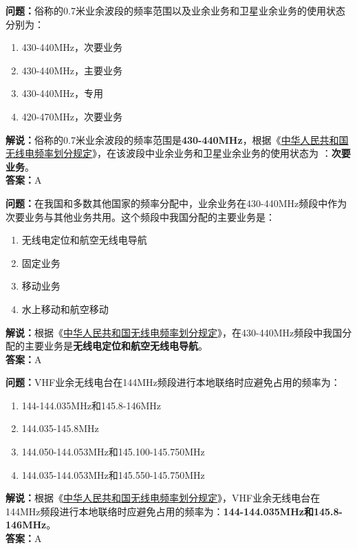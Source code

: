 \textbf{问题：}俗称的0.7米业余波段的频率范围以及业余业务和卫星业余业务的使用状态分别为：
\begin{enumerate}[label=\Alph*), leftmargin=1.5cm]
  \item 430-440MHz，次要业务
  \item 430-440MHz，主要业务
  \item 430-440MHz，专用
  \item 420-470MHz，次要业务
\end{enumerate}
\textbf{解说：}俗称的0.7米业余波段的频率范围是\textbf{430-440MHz}，根据《\href{https://www.miit.gov.cn/zwgk/zcwj/wjfb/txy/art/2020/art_066386284cd2449493586c81ccafed11.html}{中华人民共和国无线电频率划分规定}》，在该波段中业余业务和卫星业余业务的使用状态为 ：\textbf{次要业务}。\\\textbf{答案：}A

\textbf{问题：}在我国和多数其他国家的频率分配中，业余业务在430-440MHz频段中作为次要业务与其他业务共用。这个频段中我国分配的主要业务是：
\begin{enumerate}[label=\Alph*), leftmargin=1.5cm]
  \item 无线电定位和航空无线电导航
  \item 固定业务
  \item 移动业务
  \item 水上移动和航空移动
\end{enumerate}
\textbf{解说：}根据《\href{https://www.miit.gov.cn/zwgk/zcwj/wjfb/txy/art/2020/art_066386284cd2449493586c81ccafed11.html}{中华人民共和国无线电频率划分规定}》，在430-440MHz频段中我国分配的主要业务是\textbf{无线电定位和航空无线电导航}。\\\textbf{答案：}A

\textbf{问题：}VHF业余无线电台在144MHz频段进行本地联络时应避免占用的频率为：
\begin{enumerate}[label=\Alph*), leftmargin=1.5cm]
  \item 144-144.035MHz和145.8-146MHz
  \item 144.035-145.8MHz
  \item 144.050-144.053MHz和145.100-145.750MHz
  \item 144.035-144.053MHz和145.550-145.750MHz
\end{enumerate}
\textbf{解说：}根据《\href{https://www.miit.gov.cn/zwgk/zcwj/wjfb/txy/art/2020/art_066386284cd2449493586c81ccafed11.html}{中华人民共和国无线电频率划分规定}》，VHF业余无线电台在144MHz频段进行本地联络时应避免占用的频率为：\textbf{144-144.035MHz和145.8-146MHz}。\\\textbf{答案：}A%


